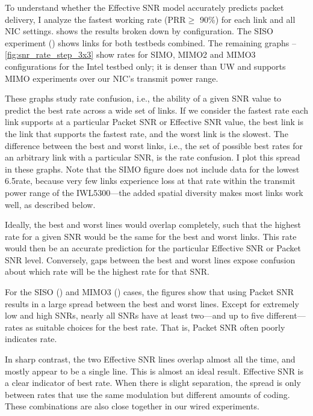 To understand whether the Effective SNR model accurately predicts packet delivery, I analyze the fastest working rate (PRR$\geq$ 90\%) for each link and all NIC settings.  shows the results broken down by configuration. The SISO experiment () shows links for both testbeds combined. The remaining graphs --\ref{fig:snr_rate_step_3x3}  show rates for SIMO, MIMO2 and MIMO3 configurations for the Intel testbed only; it is denser than UW and supports MIMO experiments over our NIC's transmit power range.

These graphs study rate confusion, i.e., the ability of a given SNR value to predict the best rate across a wide set of links. If we consider the fastest rate each link supports at a particular Packet SNR or Effective SNR value, the best link is the link that supports the fastest rate, and the worst link is the slowest. The difference between the best and worst links, i.e., the set of possible best rates for an arbitrary link with a particular SNR, is the rate confusion. I plot this spread in these graphs. Note that the SIMO figure does not include data for the lowest 6.5\Mbps rate, because very few links experience loss at that rate within the transmit power range of the IWL5300---the added spatial diversity makes most links work well, as described below.

Ideally, the best and worst lines would overlap completely, such that the highest rate for a given SNR would be the same for the best and worst links. This rate would then be an accurate prediction for the particular Effective SNR or Packet SNR level. Conversely, gaps between the best and worst lines expose confusion about which rate will be the highest rate for that SNR.

For the SISO () and MIMO3 () cases, the figures show that using Packet SNR results in a large spread between the best and worst lines. Except for extremely low and high SNRs, nearly all SNRs have at least two---and up to five different---rates as suitable choices for the best rate. That is, Packet SNR often poorly indicates rate.

In sharp contrast, %
the two Effective SNR lines overlap almost all the time, and mostly appear to be a single line. This is almost an ideal result. Effective SNR is a clear indicator of best rate. When there is slight separation, the spread is only between rates that use the same modulation but different amounts of coding. These combinations are also close together in our wired experiments. 

